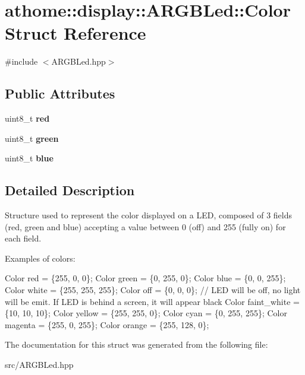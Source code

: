 \hypertarget{structathome_1_1display_1_1_a_r_g_b_led_1_1_color}{}\section{athome\+:\+:display\+:\+:A\+R\+G\+B\+Led\+:\+:Color Struct Reference}
\label{structathome_1_1display_1_1_a_r_g_b_led_1_1_color}


{\ttfamily \#include $<$A\+R\+G\+B\+Led.\+hpp$>$}

\subsection*{Public Attributes}
\begin{DoxyCompactItemize}
\item 
\mbox{\label{structathome_1_1display_1_1_a_r_g_b_led_1_1_color_a38384fe4c2a89f0879ad81ccaa377077}} 
uint8\+\_\+t {\bfseries red}
\item 
\mbox{\label{structathome_1_1display_1_1_a_r_g_b_led_1_1_color_a568646e5c308b5791def48db8f2fe5e1}} 
uint8\+\_\+t {\bfseries green}
\item 
\mbox{\label{structathome_1_1display_1_1_a_r_g_b_led_1_1_color_ae851e58f84fafd51b64c81296ae8dccf}} 
uint8\+\_\+t {\bfseries blue}
\end{DoxyCompactItemize}


\subsection{Detailed Description}
Structure used to represent the color displayed on a L\+ED, composed of 3 fields (red, green and blue) accepting a value between 0 (off) and 255 (fully on) for each field.

Examples of colors\+:


\begin{DoxyCode}
Color red = \{255, 0, 0\};
Color green = \{0, 255, 0\};
Color blue = \{0, 0, 255\};
Color white = \{255, 255, 255\};
Color off = \{0, 0, 0\}; \textcolor{comment}{// LED will be off, no light will be emit. If LED is}
behind a screen, it will appear black Color faint\_white = \{10, 10, 10\};
Color yellow = \{255, 255, 0\};
Color cyan = \{0, 255, 255\};
Color magenta = \{255, 0, 255\};
Color orange = \{255, 128, 0\};
\end{DoxyCode}
 

The documentation for this struct was generated from the following file\+:\begin{DoxyCompactItemize}
\item 
src/A\+R\+G\+B\+Led.\+hpp\end{DoxyCompactItemize}
